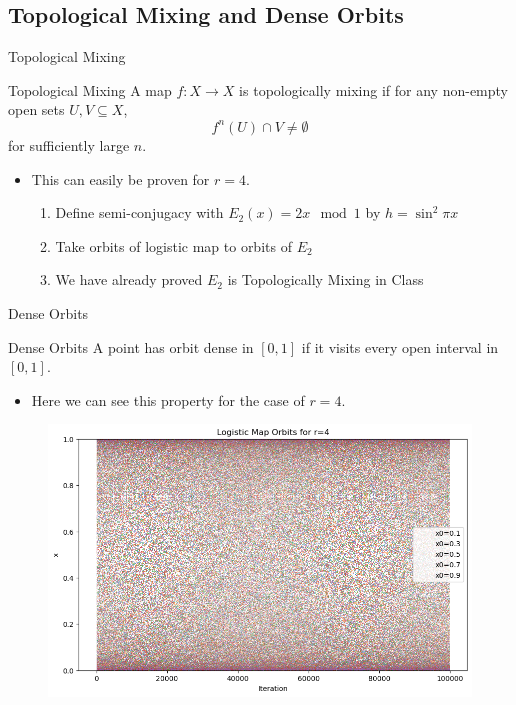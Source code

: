 \documentclass[
	11pt, %
]{beamer}
\begin{document}
\subsection{Topological Mixing and Dense Orbits}
\begin{frame}{Topological Mixing}
\begin{block}{Topological Mixing}
    A map $f:X\to X$ is topologically mixing if for any non-empty open sets $U,V\subseteq X$,
    \[f^n(U)\cap V\neq \emptyset\]
    for sufficiently large $n$.
\end{block}
\begin{itemize}
    \item This can easily be proven for $r=4$.
    \begin{enumerate}
        \item Define semi-conjugacy with $E_2(x)=2x\mod 1$ by $h=\sin^2\pi x$
        \item Take orbits of logistic map to orbits of $E_2$
        \item We have already proved $E_2$ is Topologically Mixing in Class
    \end{enumerate}   
    \end{itemize}
    
\end{frame}
\begin{frame}{Dense Orbits}
\begin{block}{Dense Orbits}
	A point has orbit dense in $[0, 1]$ if it visits every
	open interval in $[0,1]$.
\end{block}
\begin{itemize}
	\item
		Here we can see this property for the case of $r=4$.
\end{itemize}
        \begin{figure}
	\includegraphics[scale=0.2125]{../figures/denseorbits.png.png}
	\end{figure}
\end{frame}
\end{document}
